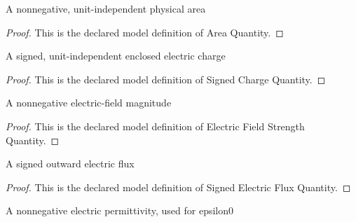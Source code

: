\begin{definition}
  \label{def:physics:phyx-mini-0840:phyxminiproblems-problemphyxmini0840-areaquantity}
  A nonnegative, unit-independent physical area
\end{definition}
\begin{proof}
  This is the declared model definition of Area Quantity.
\end{proof}
\begin{definition}
  \label{def:physics:phyx-mini-0840:phyxminiproblems-problemphyxmini0840-signedchargequantity}
  A signed, unit-independent enclosed electric charge
\end{definition}
\begin{proof}
  This is the declared model definition of Signed Charge Quantity.
\end{proof}
\begin{definition}
  \label{def:physics:phyx-mini-0840:phyxminiproblems-problemphyxmini0840-electricfieldstrengthquantity}
  A nonnegative electric-field magnitude
\end{definition}
\begin{proof}
  This is the declared model definition of Electric Field Strength Quantity.
\end{proof}
\begin{definition}
  \label{def:physics:phyx-mini-0840:phyxminiproblems-problemphyxmini0840-signedelectricfluxquantity}
  A signed outward electric flux
\end{definition}
\begin{proof}
  This is the declared model definition of Signed Electric Flux Quantity.
\end{proof}
\begin{definition}
  \label{def:physics:phyx-mini-0840:phyxminiproblems-problemphyxmini0840-electricpermittivityquantity}
  A nonnegative electric permittivity, used for epsilon0
\end{definition}
